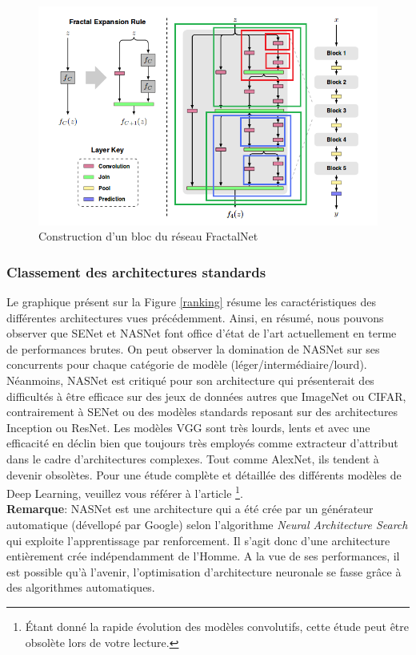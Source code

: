 \begin{figure}
    \centering
    \includegraphics[scale=0.4]{./tex/convolution-network/classifier/fractalnet.png}
    \caption{Construction d'un bloc du réseau FractalNet}
    \label{fractalnet}
\end{figure}

\subsubsection{Classement des architectures standards}
Le graphique présent sur la Figure \ref{ranking} résume les caractéristiques des différentes architectures vues précédemment. Ainsi, en résumé, nous pouvons observer que SENet et NASNet font office d'état de l'art actuellement en terme de performances brutes. On peut observer la domination de NASNet sur ses concurrents pour chaque catégorie de modèle (léger/intermédiaire/lourd). Néanmoins, NASNet est critiqué pour son architecture qui présenterait des difficultés à être efficace sur des jeux de données autres que ImageNet ou CIFAR, contrairement à SENet ou des modèles standards reposant sur des architectures Inception ou ResNet. Les modèles VGG sont très lourds, lents et avec une efficacité en déclin bien que toujours très employés comme extracteur d'attribut dans le cadre d'architectures complexes. Tout comme AlexNet, ils tendent à devenir obsolètes. Pour une étude complète et détaillée des différents modèles de Deep Learning, veuillez vous référer à l'article \cite{ranking2}\footnote{Étant donné la rapide évolution des modèles convolutifs, cette étude peut être obsolète lors de votre lecture.}.\\

\noindent \textbf{Remarque}: NASNet est une architecture qui a été crée par un générateur automatique (dévellopé par Google) selon l'algorithme \textit{Neural Architecture Search} qui exploite l'apprentissage par renforcement. Il s'agit donc d'une architecture entièrement crée indépendamment de l'Homme. A la vue de ses performances, il est possible qu'à l'avenir, l'optimisation d'architecture neuronale se fasse grâce à des algorithmes automatiques.


